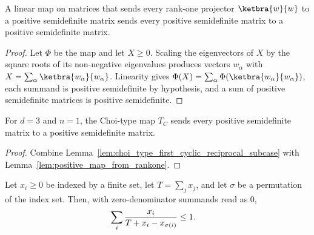 \begin{lemma}
    \label{lem:positive_map_from_rankone}
    \leanok
    A linear map on matrices that sends every rank-one projector
    $\ketbra{w}{w}$ to a positive semidefinite matrix sends every positive
    semidefinite matrix to a positive semidefinite matrix.
\end{lemma}

\begin{proof}
    \leanok
    Let $\Phi$ be the map and let $X\ge0$. Scaling the eigenvectors of $X$ by
    the square roots of its non-negative eigenvalues produces vectors
    $w_\alpha$ with $X=\sum_\alpha \ketbra{w_\alpha}{w_\alpha}$.
    Linearity gives
    $\Phi(X)=\sum_\alpha \Phi(\ketbra{w_\alpha}{w_\alpha})$, each summand is
    positive semidefinite by hypothesis, and a sum of positive semidefinite
    matrices is positive semidefinite.
\end{proof}

\begin{theorem}
    \label{thm:choi_type_first_positive_subcase}
    \leanok
    For $d=3$ and $n=1$, the Choi-type map $T_C$ sends every positive
    semidefinite matrix to a positive semidefinite matrix.
\end{theorem}

\begin{proof}
    \leanok
    Combine Lemma~\ref{lem:choi_type_first_cyclic_reciprocal_subcase} with
    Lemma~\ref{lem:positive_map_from_rankone}.
\end{proof}

\begin{lemma}
    \label{lem:choi_type_perm_reciprocal}
    \leanok
    Let $x_i\ge0$ be indexed by a finite set, let $T=\sum_j x_j$, and let
    $\sigma$ be a permutation of the index set. Then, with zero-denominator
    summands read as $0$,
    \begin{align}
        \sum_i \frac{x_i}{T+x_i-x_{\sigma(i)}}
         & \le 1.
        \notag
    \end{align}
\end{lemma}

